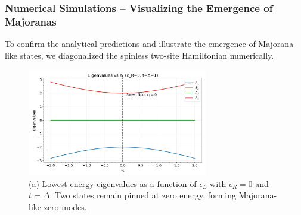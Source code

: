 \documentclass[11pt, letterpaper, titlepage]{article}
\begin{document}
\subsubsection{Numerical Simulations – Visualizing the Emergence of Majoranas}

To confirm the analytical predictions and illustrate the emergence of Majorana-like states, we diagonalized the spinless two-site Hamiltonian numerically.

\begin{figure}[htbp]
  \centering
  \includegraphics[width=0.7\textwidth]{../Figures/singlebody_sweetspot_eps.png}
  \caption{(a) Lowest energy eigenvalues as a function of $\epsilon_L$ with $\epsilon_R = 0$ and $t = \Delta$. Two states remain pinned at zero energy, forming Majorana-like zero modes.}
  \label{fig:sb_epsL}
\end{figure}
\end{document}
